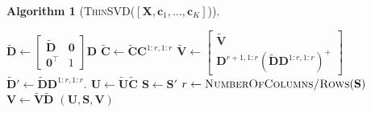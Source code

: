 \documentclass[11pt,a4paper]{article}
\theoremstyle{break}
\newtheorem*{algorithm}{Algorithm}
\numberwithin{dummy}{section}
\theoremstyle{plain}
\theoremstyle{plain}
\theoremstyle{plain}
\theoremstyle{plain}
\theoremstyle{plain}
\theoremstyle{MyNonumberplain}
\newcommand{\0}{\M{0}}
\newcommand{\M}[1]{\mathbf{#1}}
\newcommand{\Mt}[1]{\tilde{\M{#1}}}
\newcommand{\T}{\top}
\newcommand{\ve}[1]{\mathbf{#1}}
\begin{document}
\begin{algorithm}[\textnormal{\textsc{ThinSVD}(\unboldmath$[\M{X}, \ve{c}_1, \dots, \ve{c}_K]$)}]
\begin{algorithmic}[1]
    \State
    \begin{math}
      \Mt{D}
      \gets
      \begin{bmatrix}
        \Mt{D} & \0
        \\
        \0^\T & 1
      \end{bmatrix}
      \M{D}
    \end{math}
    \Else
    \State
    \begin{math}
      \Mt{C}
      \gets
      \Mt{C}  \M{C}^{1:r, 1:r}
    \end{math}
    \State
    \begin{math}
      \Mt{V}
      \gets
      \begin{bmatrix}
        \Mt{V}
        \\
        \M{D}^{r+1, 1:r} \left(\Mt{D} \M{D}^{1:r,1:r} \right)^+
      \end{bmatrix}
    \end{math}
    \State
    \begin{math}
      \Mt{D}'
      \gets
      \Mt{D} \M{D}^{1:r, 1:r}.
    \end{math}
    \EndIf
    \State
    \begin{math}
      \M{U} \gets \Mt{U} \Mt{C}
    \end{math}
    \State
    \begin{math}
      \M{S} \gets \M{S}'
    \end{math}
    \State
    \begin{math}
      r \gets \textsc{NumberOfColumns/Rows}(\M{S})
    \end{math}
    \EndFor
    \State
    \begin{math}
      \M{V} \gets \Mt{V} \Mt{D}
    \end{math}
    \State
    \Return $(\M{U}, \M{S}, \M{V})$
  \end{algorithmic}
\end{algorithm}


\end{document}
